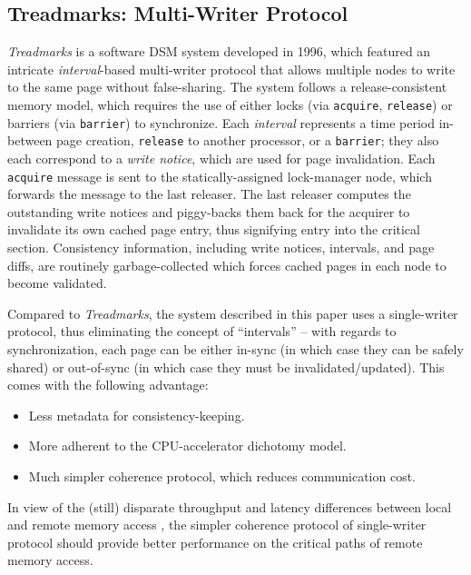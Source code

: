 \documentclass{article}
\begin{document}
\subsection{Treadmarks: Multi-Writer Protocol}
\textit{Treadmarks}\cite{Amza_etal.Treadmarks.1996} is a software DSM system
developed in 1996, which featured an intricate \textit{interval}-based
multi-writer protocol that allows multiple nodes to write to the same page
without false-sharing. The system follows a release-consistent memory model,
which requires the use of either locks (via \texttt{acquire}, \texttt{release})
or barriers (via \texttt{barrier}) to synchronize. Each \textit{interval}
represents a time period in-between page creation, \texttt{release} to another
processor, or a \texttt{barrier}; they also each correspond to a
\textit{write notice}, which are used for page invalidation. Each \texttt{acquire}
message is sent to the statically-assigned lock-manager node, which forwards the
message to the last releaser. The last releaser computes the outstanding write
notices and piggy-backs them back for the acquirer to invalidate its own cached
page entry, thus signifying entry into the critical section. Consistency
information, including write notices, intervals, and page diffs, are routinely
garbage-collected which forces cached pages in each node to become validated.

Compared to \textit{Treadmarks}, the system described in this paper uses a
single-writer protocol, thus eliminating the concept of ``intervals'' --
with regards to synchronization, each page can be either in-sync (in which case
they can be safely shared) or out-of-sync (in which case they must be
invalidated/updated). This comes with the following advantage:

\begin{itemize}
    \item Less metadata for consistency-keeping.
    \item More adherent to the CPU-accelerator dichotomy model.
    \item Much simpler coherence protocol, which reduces communication cost.
\end{itemize}

In view of the (still) disparate throughput and latency differences between local
and remote memory access \cite{Cai_etal.Distributed_Memory_RDMA_Cached.2018},
the simpler coherence protocol of single-writer protocol should provide better
performance on the critical paths of remote memory access.
\end{document}
